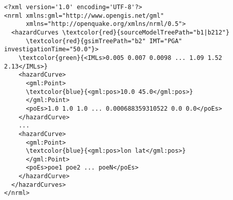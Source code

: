 \begin{Verbatim}[frame=single, commandchars=\\\{\}, fontsize=\small]
<?xml version='1.0' encoding='UTF-8'?>
<nrml xmlns:gml="http://www.opengis.net/gml"
      xmlns="http://openquake.org/xmlns/nrml/0.5">
  <hazardCurves \textcolor{red}{sourceModelTreePath="b1|b212"}
      \textcolor{red}{gsimTreePath="b2" IMT="PGA" investigationTime="50.0"}>
    \textcolor{green}{<IMLs>0.005 0.007 0.0098 ... 1.09 1.52 2.13</IMLs>}
    <hazardCurve>
      <gml:Point>
      \textcolor{blue}{<gml:pos>10.0 45.0</gml:pos>}
      </gml:Point>
      <poEs>1.0 1.0 1.0 ... 0.000688359310522 0.0 0.0</poEs>
    </hazardCurve>
    ...
    <hazardCurve>
      <gml:Point>
      \textcolor{blue}{<gml:pos>lon lat</gml:pos>}
      </gml:Point>
      <poEs>poe1 poe2 ... poeN</poEs>
    </hazardCurve>
  </hazardCurves>
</nrml>
\end{Verbatim}